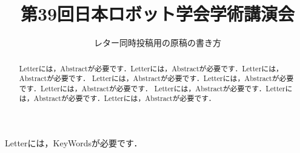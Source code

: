 \documentclass[paper]{jrsj_UTF-8}
\title{第39回日本ロボット学会学術講演会}
\subtitle{レター同時投稿用の原稿の書き方}
\begin{document}
\begin{abstract}
Letterには，Abstractが必要です．Letterには，Abstractが必要です．Letterには，Abstractが必要です．
Letterには，Abstractが必要です．Letterには，Abstractが必要です．Letterには，Abstractが必要です．
Letterには，Abstractが必要です．Letterには，Abstractが必要です．Letterには，Abstractが必要です．
\end{abstract}
\begin{keywords}
Letterには，KeyWordsが必要です．
\end{keywords}
\maketitle




   
\end{document}
